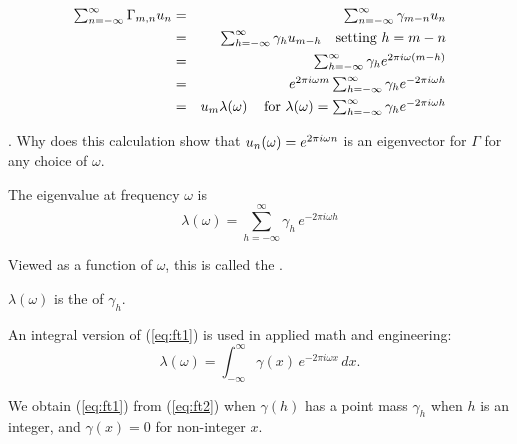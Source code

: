 \begin{frame}[fragile]

\vspace{-3mm}

\begin{eqnarray*} \textstyle
\sum_{n=-\infty}^\infty \Gamma_{m,n} u_n 
&=&
\textstyle
\sum_{n=-\infty}^\infty \gamma_{m-n} u_n 
\\
&=&
\textstyle
\sum_{h=-\infty}^\infty \gamma_{h}  u_{m-h} \quad \mbox{setting $h=m-n$}
\\
&=&
\textstyle
\sum_{h=-\infty}^\infty \gamma_{h}  e^{2\pi i\omega(m-h)}
\\
&=&
\textstyle
e^{2\pi i\omega m} \sum_{h=-\infty}^\infty \gamma_{h}  e^{-2\pi i\omega h}
\\
&=&
\textstyle
u_m \lambda(\omega) \hspace{3mm} \mbox{ for } \lambda(\omega)= \sum_{h=-\infty}^\infty \gamma_{h}  e^{-2\pi i\omega h}
\end{eqnarray*}

\myquestion. Why does this calculation show that 
$u_n(\omega) = e^{2\pi i\omega n}$
is an eigenvector for $\Gamma$ for any choice of $\omega$.


\end{frame}
\begin{frame}[fragile]

\bi
\item 
The eigenvalue at frequency $\omega$ is
\begin{equation}
\label{eq:ft1}
\lambda(\omega)= \sum_{h=-\infty}^\infty \gamma_{h} \,  e^{-2\pi i\omega h}\end{equation}
\item Viewed as a function of $\omega$, this is called the .

\item $\lambda(\omega)$ is the  of $\gamma_h$.

\item An integral version of (\ref{eq:ft1}) is used in applied math and engineering:
\begin{equation}
\label{eq:ft2}
\lambda(\omega) = \int_{-\infty}^{\infty} \gamma(x) \, e^{-2\pi i\omega x}\, dx.
\end{equation}
\item We obtain (\ref{eq:ft1}) from (\ref{eq:ft2}) when $\gamma(h)$ has a point mass $\gamma_h$ when $h$ is an integer, and $\gamma(x)=0$ for non-integer $x$.
\ei

\end{frame}

